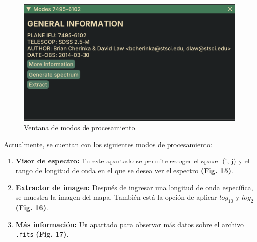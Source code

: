 \documentclass[9pt,twocolumn,a4paper]{opticajnl}
\begin{document}
\begin{figure}
    \centering
    \includegraphics[width=1\linewidth]{modes.png}
    \caption{Ventana de modos de procesamiento.}
    \label{fig:modes}
\end{figure}

Actualmente, se cuentan con los siguientes modos de procesamiento:

\begin{enumerate}
\item \textbf{Visor de espectro:} En este apartado se permite escoger el spaxel (i, j) y el rango de longitud de onda en el que se desea ver el espectro \textbf{(Fig. 15)}.
\item \textbf{Extractor de imagen:} Después de ingresar una longitud de onda específica, se muestra la imagen del mapa. También está la opción de aplicar $log_{10}$ y $log_{2}$ \textbf{(Fig. 16)}.
\item \textbf{Más información:} Un apartado para observar más datos sobre el archivo \verb|.fits| \textbf{(Fig. 17)}.
\end{enumerate}
\end{document}
